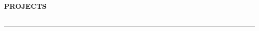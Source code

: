 \begin{center}
\textbf{PROJECTS}
\end{center}

\vspace{0.3cm}

\begin{longtable}{p{}p{}}




\end{longtable}

\vspace{0.5cm}
\rule{\textwidth}{0.5pt}
\vspace{0.5cm} 